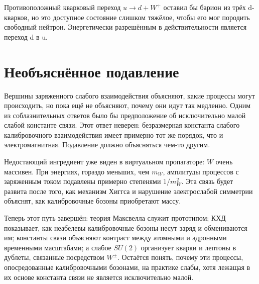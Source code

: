 Противоположный кварковый переход \(u\to d+W^+\) оставил бы барион из трёх d-кварков,
но это доступное состояние слишком тяжёлое, чтобы его мог породить свободный
нейтрон. Энергетически разрешённым в действительности является переход d в u.

\begin{classroomqa}
\end{classroomqa}

\section{Необъяснённое подавление}

Вершины заряженного слабого взаимодействия объясняют, какие процессы могут происходить, но пока ещё не объясняют, почему они идут так медленно. Одним из соблазнительных ответов было бы предположение об исключительно малой слабой константе связи. Этот ответ неверен: безразмерная константа слабого калибровочного взаимодействия имеет примерно тот же порядок, что и электромагнитная. Подавление должно объясняться чем-то другим.

Недостающий ингредиент уже виден в виртуальном пропагаторе: \(W\) очень массивен. При энергиях, гораздо меньших, чем \(m_W\), амплитуды процессов с заряженным током подавлены примерно степенями \(1/m_W^2\). Эта связь будет развита после того, как механизм Хиггса и нарушение электрослабой симметрии объяснят, как калибровочные бозоны приобретают массу.

\begin{classroomqa}
\end{classroomqa}

Теперь этот путь завершён: теория Максвелла служит прототипом; КХД показывает, как неабелевы калибровочные бозоны несут заряд и обмениваются им; константы связи объясняют контраст между атомными и адронными временными масштабами; а слабое \(SU(2)\) организует кварки и лептоны в дублеты, связанные посредством \(W^\pm\). Остаётся понять, почему эти процессы, опосредованные калибровочными бозонами, на практике слабы, хотя лежащая в их основе константа связи не является исключительно малой.
